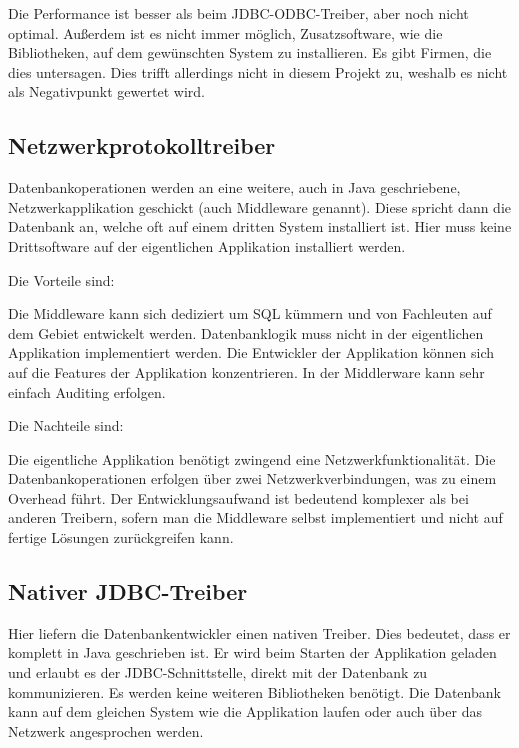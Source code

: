 Die Performance ist besser als beim JDBC-ODBC-Treiber, aber noch nicht optimal.
Außerdem ist es nicht immer möglich, Zusatzsoftware, wie die Bibliotheken, auf
dem gewünschten System zu installieren. Es gibt Firmen, die dies untersagen.
Dies trifft allerdings nicht in diesem Projekt zu, weshalb es nicht als
Negativpunkt gewertet wird.

\subsection{Netzwerkprotokolltreiber}
Datenbankoperationen werden an eine weitere, auch in Java geschriebene,
Netzwerkapplikation geschickt (auch \gls{Middleware} genannt). Diese spricht
dann die Datenbank an, welche oft auf einem dritten System installiert ist.
Hier muss keine Drittsoftware auf der eigentlichen Applikation installiert
werden.

Die Vorteile sind:

\begin{outline}
  \1 Die Middleware kann sich dediziert um SQL kümmern und von Fachleuten auf
  dem Gebiet entwickelt werden.
  \1 Datenbanklogik muss nicht in der eigentlichen Applikation implementiert
  werden. Die Entwickler der Applikation können sich auf die Features der
  Applikation konzentrieren.
  \1 In der Middlerware kann sehr einfach Auditing erfolgen.
\end{outline}

Die Nachteile sind:

\begin{outline}
  \1 Die eigentliche Applikation benötigt zwingend eine Netzwerkfunktionalität.
  \1 Die Datenbankoperationen erfolgen über zwei Netzwerkverbindungen, was
  zu einem Overhead führt.
  \1 Der Entwicklungsaufwand ist bedeutend komplexer als bei anderen Treibern,
  sofern man die Middleware selbst implementiert und nicht auf fertige Lösungen
  zurückgreifen kann.
\end{outline}

\subsection{Nativer JDBC-Treiber}
Hier liefern die Datenbankentwickler einen nativen Treiber. Dies bedeutet, dass
er komplett in Java geschrieben ist. Er wird beim Starten der Applikation
geladen und erlaubt es der JDBC-Schnittstelle, direkt mit der Datenbank zu
kommunizieren. Es werden keine weiteren Bibliotheken benötigt. Die Datenbank
kann auf dem gleichen System wie die Applikation laufen oder auch über das
Netzwerk angesprochen werden.

